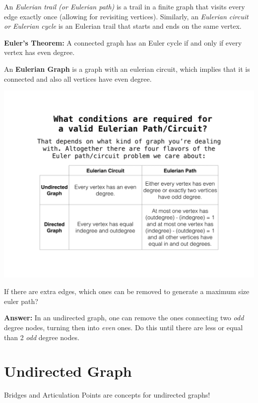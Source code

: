 	An \textit{Eulerian trail (or Eulerian path)} is a trail in a finite graph that visits every edge exactly once 
	(allowing for revisiting vertices). Similarly, an \textit{Eulerian circuit or Eulerian cycle} is an Eulerian trail 
	that starts and ends on the same vertex. 

	\textbf{Euler's Theorem:} A connected graph has an Euler cycle if and only if every vertex has even degree.

	An \textbf{Eulerian Graph} is a graph with an eulerian circuit, which implies that it is connected and 
	also all vertices have even degree.

	\begin{center}
	\includegraphics[scale=.1, keepaspectratio]{content/graph/Eulerian-Path-Existence.png}
	\end{center}

	If there are extra edges, which ones can be removed to generate a maximum size euler path?

	\textbf{Answer:} In an undirected graph, one can remove the ones connecting two \textit{odd} degree 
	nodes, turning then into \textit{even} ones. Do this until there are less or equal than 2 \textit{odd} degree nodes. 


\section{Undirected Graph}

	Bridges and Articulation Points are concepts for undirected graphs!
	
